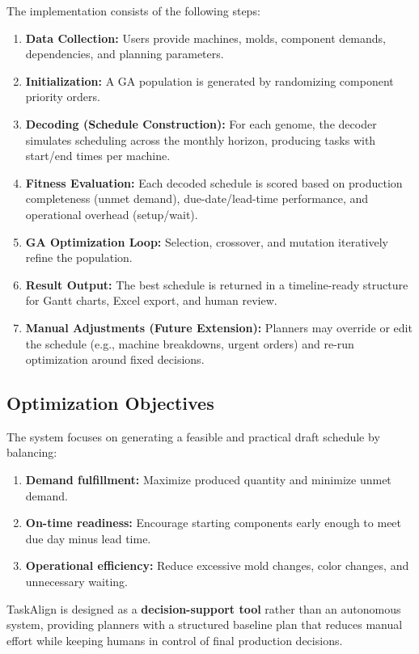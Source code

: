 The implementation consists of the following steps:
\begin{enumerate}
    \item \textbf{Data Collection:} Users provide machines, molds, component demands, dependencies, and planning parameters.
    \item \textbf{Initialization:} A GA population is generated by randomizing component priority orders.
    \item \textbf{Decoding (Schedule Construction):} For each genome, the decoder simulates scheduling across the monthly horizon, producing tasks with start/end times per machine.
    \item \textbf{Fitness Evaluation:} Each decoded schedule is scored based on production completeness (unmet demand), due-date/lead-time performance, and operational overhead (setup/wait).
    \item \textbf{GA Optimization Loop:} Selection, crossover, and mutation iteratively refine the population.
    \item \textbf{Result Output:} The best schedule is returned in a timeline-ready structure for Gantt charts, Excel export, and human review.
    \item \textbf{Manual Adjustments (Future Extension):} Planners may override or edit the schedule (e.g., machine breakdowns, urgent orders) and re-run optimization around fixed decisions.
\end{enumerate}

\subsection{Optimization Objectives}
The system focuses on generating a feasible and practical draft schedule by balancing:
\begin{enumerate}
    \item \textbf{Demand fulfillment:} Maximize produced quantity and minimize unmet demand.
    \item \textbf{On-time readiness:} Encourage starting components early enough to meet due day minus lead time.
    \item \textbf{Operational efficiency:} Reduce excessive mold changes, color changes, and unnecessary waiting.
\end{enumerate}

TaskAlign is designed as a \textbf{decision-support tool} rather than an autonomous system, providing planners with a structured baseline plan that reduces manual effort while keeping humans in control of final production decisions.


% 
% 


